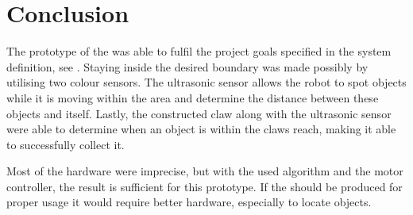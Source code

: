 \section{Conclusion} \label{sec:conclusion}


The prototype of the \projname{} was able to fulfil the project goals specified in the system definition, see . Staying inside the desired boundary was made possibly by utilising two colour sensors. The ultrasonic sensor allows the robot to spot objects while it is moving within the area and determine the distance between these objects and itself. Lastly, the constructed claw along with the ultrasonic sensor were able to determine when an object is within the claws reach, making it able to successfully collect it. 

Most of the hardware were imprecise, but with the used algorithm and the motor controller, the result is sufficient for this prototype. If the \projname{} should be produced for proper usage it would require better hardware, especially to locate objects.







